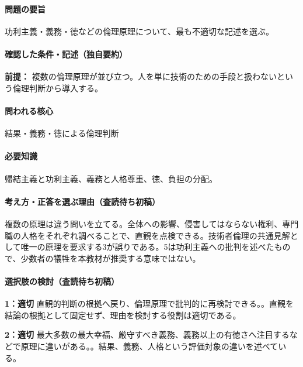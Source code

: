 \paragraph{問題の要旨} 功利主義・義務・徳などの倫理原理について、最も不適切な記述を選ぶ。

\paragraph{確認した条件・記述（独自要約）}\mbox{}\par

\noindent\textbf{前提：} 複数の倫理原理が並び立つ。人を単に技術のための手段と扱わないという倫理判断から導入する。\par

\paragraph{問われる核心} 結果・義務・徳による倫理判断

\paragraph{必要知識} 帰結主義と功利主義、義務と人格尊重、徳、負担の分配。

\paragraph{考え方・正答を選ぶ理由（査読待ち初稿）} 複数の原理は違う問いを立てる。全体への影響、侵害してはならない権利、専門職の人格をそれぞれ調べることで、直観を点検できる。技術者倫理の共通見解として唯一の原理を要求する3が誤りである。5は功利主義への批判を述べたもので、少数者の犠牲を本教材が推奨する意味ではない。

\paragraph{選択肢の検討（査読待ち初稿）}\mbox{}\par

\noindent\textbf{1：適切} 直観的判断の根拠へ戻り、倫理原理で批判的に再検討できる。。直観を結論の根拠として固定せず、理由を検討する役割は適切である。\par

\noindent\textbf{2：適切} 最大多数の最大幸福、厳守すべき義務、義務以上の有徳さへ注目するなどで原理に違いがある。。結果、義務、人格という評価対象の違いを述べている。\par

